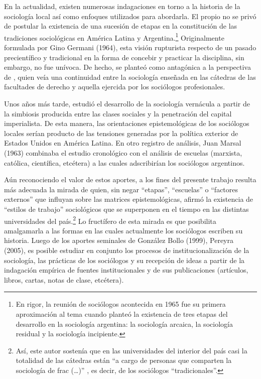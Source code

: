 En la actualidad, existen numerosas indagaciones en torno a la historia de la sociología local así como enfoques utilizados para abordarla. El propio \textcite{1631-AGULLA1984} no se privó de postular la existencia de una sucesión de etapas en la constitución de las tradiciones sociológicas en América Latina y Argentina.\footnote{En rigor, la reunión de sociólogos acontecida en 1965 \parencite{1632-AGULLA1966} fue su primera aproximación al tema cuando planteó la existencia de tres etapas del desarrollo en la sociología argentina: la sociología arcaica, la sociología residual y la sociología incipiente.} Originalmente formulada por Gino Germani (1964), esta visión rupturista respecto de un pasado precientífico y tradicional en la forma de concebir y practicar la disciplina, sin embargo, no fue unívoca. De hecho, se planteó como antagónica a la perspectiva de \textcite{1534-POVINA1959}, quien veía una continuidad entre la sociología enseñada en las cátedras de las facultades de derecho y aquella ejercida por los sociólogos profesionales.

Unos años más tarde, \textcite{1450-VERON1974} estudió el desarrollo de la sociología vernácula a partir de la simbiosis producida entre las clases sociales y la penetración del capital imperialista. De esta manera, las orientaciones epistemológicas de los sociólogos locales serían producto de las tensiones generadas por la política exterior de Estados Unidos en América Latina. En otro registro de análisis, Juan Marsal (1963) combinaba el estudio cronológico con el análisis de escuelas (marxista, católica, científica, etcétera) a las cuales adscribirían los sociólogos argentinos.

Aún reconociendo el valor de estos aportes, a los fines del presente trabajo resulta más adecuada la mirada de \textcite{1613-DELICH1977} quien, sin negar \enquote{etapas}, \enquote{escuelas} o \enquote{factores externos} que influyan sobre las matrices epistemológicas, afirmó la existencia de \enquote{estilos de trabajo} sociológicos que se superponen en el tiempo en las distintas universidades del país.\footnote{Así, este autor sostenía que en las universidades del interior del país casi la totalidad de las cátedras están \enquote{a cargo de personas que comparten la sociología de frac (\dots)} \parencite[34]{1613-DELICH1977}, es decir, de los sociólogos \enquote{tradicionales}.} Lo fructífero de esta mirada es que posibilita amalgamarla a las formas en las cuales actualmente los sociólogos escriben su historia. Luego de los aportes seminales de \textcite{1565-BLANCO2006} González Bollo (1999), Pereyra (2005), es posible estudiar en conjunto los procesos de institucionalización de la sociología, las prácticas de los sociólogos y su recepción de ideas a partir de la indagación empírica de fuentes institucionales y de sus publicaciones (artículos, libros, cartas, notas de clase, etcétera).

